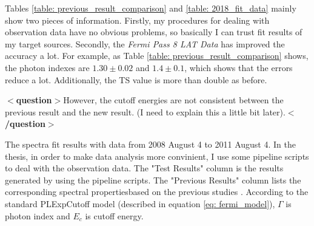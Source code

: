 \documentclass[12pt]{report}
\newcommand{\mycaption}[1]{\protect \caption{#1}}
\newcommand{\question}[1]{
  $<$\textbf{question}$>$#1$<$\textbf{/question}$>$
}
\begin{document}
      Tables \ref{table: previous_result_comparison} and \ref{table: 2018_fit_data} mainly 
      show two pieces of information. Firstly, my procedures for dealing with observation 
      data have no obvious problems, so basically I can trust fit results of my target 
      sources. Secondly, the \textit{Fermi Pass 8 LAT Data} has improved the accuracy a 
      lot. For example, as Table \ref{table: previous_result_comparison} shows, the photon 
      indexes are $1.30\pm0.02$ and $1.4\pm0.1$, which shows that the errors reduce a lot. 
      Additionally, the TS value is more than double as before.
      \question{However, the cutoff energies are not consistent between the previous result and the new result.
        (I need to explain this a little bit later).}
      \vspace{1cm} 
      \begin{table}[!ht]
        \centering
        \vspace{0.5cm}
          \centering
          \mycaption{The spectra fit results with data from 2008 August 4 to 2011 August 4. 
            In the thesis, in order to make data 
            analysis more convinient, I use some pipeline scripts to deal with the 
            observation data. The "Test Results" column is the results generated by 
            using the pipeline scripts. The "Previous Results" column lists the 
            corresponding spectral propertiesbased on the previous studies 
            \citep{0067-0049-208-2-17}. According to the standard 
            PLExpCutoff model (described in equation \ref{eq: fermi_model}), $\Gamma$ is 
            photon index and $E_c$ is cutoff energy.}
          \label{table: previous_result_comparison}
      \end{table}
      \vspace{1cm}            
\end{document}
